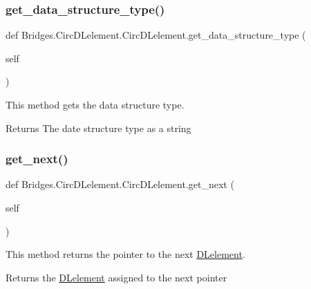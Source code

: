 \subsubsection{\texorpdfstring{get\+\_\+data\+\_\+structure\+\_\+type()}{get\_data\_structure\_type()}}
{\footnotesize\ttfamily def Bridges.\+Circ\+D\+Lelement.\+Circ\+D\+Lelement.\+get\+\_\+data\+\_\+structure\+\_\+type (\begin{DoxyParamCaption}\item[{}]{self }\end{DoxyParamCaption})}



This method gets the data structure type. 

\begin{DoxyReturn}{Returns}
The date structure type as a string 
\end{DoxyReturn}
\mbox{\label{class_bridges_1_1_circ_d_lelement_1_1_circ_d_lelement_aa5ee07b40eed6b8528d4dcae0bbd7dd1}} 
\subsubsection{\texorpdfstring{get\+\_\+next()}{get\_next()}}
{\footnotesize\ttfamily def Bridges.\+Circ\+D\+Lelement.\+Circ\+D\+Lelement.\+get\+\_\+next (\begin{DoxyParamCaption}\item[{}]{self }\end{DoxyParamCaption})}



This method returns the pointer to the next \mbox{\hyperlink{namespace_bridges_1_1_d_lelement}{D\+Lelement}}. 

\begin{DoxyReturn}{Returns}
the \mbox{\hyperlink{namespace_bridges_1_1_d_lelement}{D\+Lelement}} assigned to the next pointer 
\end{DoxyReturn}
\mbox{\label{class_bridges_1_1_circ_d_lelement_1_1_circ_d_lelement_ada3069ef0cf2cf2960b5b87036ba66dd}} 
